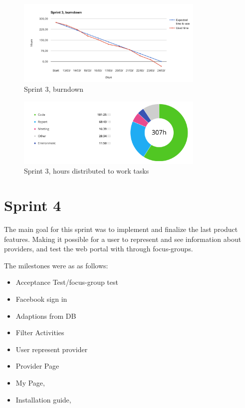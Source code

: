 \begin{figure}[ht]
\centering
    \includegraphics[width=0.8\textwidth]{fig/sprint3}
\caption{Sprint 3, burndown}
\label{Burndown_Sprint3}
\end{figure}

\begin{figure}[ht]
\centering
    \includegraphics[width=0.8\textwidth]{fig/sprint3-diagram}
\caption{Sprint 3, hours distributed to work tasks}
\label{Hours_Diagram_Sprint3}
\end{figure}

\section{Sprint 4}
\label{sprint4}
The main goal for this sprint was to implement and finalize the last product features. Making it possible for a user to represent and see information about providers, and test the web portal with through focus-groups.  

The milestones were as as follows: 
\begin{itemize}
    \item Acceptance Test/focus-group test
    \item Facebook sign in
    \item Adaptions from DB
    \item Filter Activities
    \item User represent provider 
    \item Provider Page
    \item My Page, 
    \item Installation guide, 
\end{itemize}

